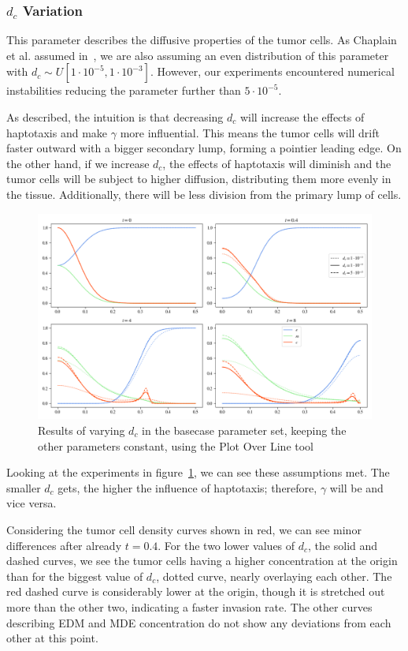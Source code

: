 \subsubsection*{$d_c$ Variation}
This parameter describes the diffusive properties of the tumor cells. As Chaplain et al. assumed in~\cite{STEPHANOU200696}, we are also assuming an even distribution of this parameter with $d_c \sim U[1\cdot 10^{-5}, 1\cdot 10^{-3}]$. However, our experiments encountered numerical instabilities reducing the parameter further than $5 \cdot 10^{-5}$. 

As described, the intuition is that decreasing $d_c$ will increase the effects of haptotaxis and make $\gamma$ more influential. This means the tumor cells will drift faster outward with a bigger secondary lump, forming a pointier leading edge. On the other hand, if we increase $d_c$, the effects of haptotaxis will diminish and the tumor cells will be subject to higher diffusion, distributing them more evenly in the tissue. Additionally, there will be less division from the primary lump of cells. 
\begin{figure}[h!]
 \centering
 \includegraphics[width=\textwidth]{resources/images/dc_variation.png}
 \caption{Results of varying $d_c$ in the basecase parameter set, keeping the other parameters constant, using the Plot Over Line tool}
 \label{fig:dc_variation}
\end{figure}
Looking at the experiments in figure~\ref{fig:dc_variation}, we can see these assumptions met. The smaller $d_c$ gets, the higher the influence of haptotaxis; therefore, $\gamma$ will be and vice versa.

Considering the tumor cell density curves shown in red, we can see minor differences after already $t=0.4$. For the two lower values of $d_c$, the solid and dashed curves, we see the tumor cells having a higher concentration at the origin than for the biggest value of $d_c$, dotted curve, nearly overlaying each other. The red dashed curve is considerably lower at the origin, though it is stretched out more than the other two, indicating a faster invasion rate. The other curves describing EDM and MDE concentration do not show any deviations from each other at this point.

